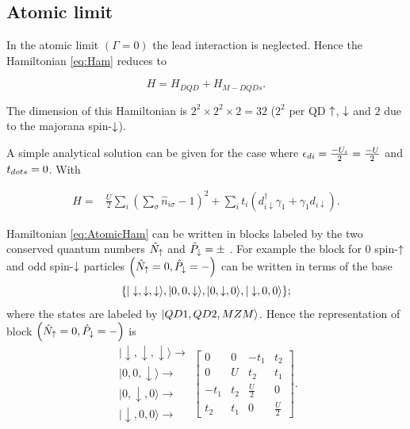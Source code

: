 \documentclass[showpacs,aps,prb,reprint,superscriptaddress]{revtex4-1}
\begin{document}
\subsection{Atomic limit}
\label{sec:AtomicLimit}


In the atomic limit $(\Gamma = 0)$ the lead interaction is neglected. Hence the Hamiltonian \eqref{eq:Ham} reduces to 

    \begin{equation}
        H=H_{DQD}+H_{M-DQDs}.
    \end{equation}
    
The dimension of this Hamiltonian is $2^2\times2^2\times 2 =32$ ($2^2$ per QD $\uparrow$, $\downarrow$ and $2$ due to the majorana spin-$\downarrow$). 

A simple analytical solution can be given for the case where  $\epsilon_{di}=\frac{-U_i}{2}=\frac{-U}{2}$ and $t_{dots} = 0$. With

    \begin{eqnarray}
        H=  & \frac{U}{2}\sum_i(\sum_{\sigma} \hat{n}_{i\sigma}-1)^{2} +  \sum_{i} t_i \left(d_{i\downarrow}^{\dagger}\gamma_{1}+\gamma_{1}d_{i\downarrow}\right).
        \label{eq:AtomicHam}
    \end{eqnarray}


Hamiltonian \eqref{eq:AtomicHam} can be written in blocks labeled by the  two conserved quantum numbers $\hat{N}_\uparrow $ and $\hat{P}_\downarrow = \pm$ . For example the block  for $0$ spin-$\uparrow$  and odd spin-$\downarrow$ particles  $\left( \hat{N}_\uparrow =0, \hat{P}_\downarrow = - \right)$ can be written in terms of the base 
    \begin{equation}
        \lbrace \vert \downarrow,\downarrow,\downarrow \rangle , \vert 0,0,\downarrow \rangle , \vert 0,\downarrow,0 \rangle, \vert \downarrow,0,0 \rangle     \rbrace;
    \end{equation}
where the states are labeled by  $\vert QD1,QD2,MZM \rangle$. Hence the representation of block $\left( \hat{N}_\uparrow =0, \hat{P}_\downarrow = - \right) $ is 
    \begin{equation}
    \begin{array}{c}
        \vert\downarrow,\downarrow,\downarrow\rangle\rightarrow\\
        \vert0,0,\downarrow\rangle\rightarrow\\
        \vert0,\downarrow,0\rangle\rightarrow\\
        \vert\downarrow,0,0\rangle\rightarrow
        \end{array}\left[\begin{array}{cccc}
        0 & 0 & -t_1 & t_2\\
        0 & U & t_2 & t_1\\
        -t_1 & t_2 & \frac{U}{2} & 0\\
        t_2 & t_1 & 0 & \frac{U}{2}
    \end{array}\right].
    \end{equation}
\end{document}
